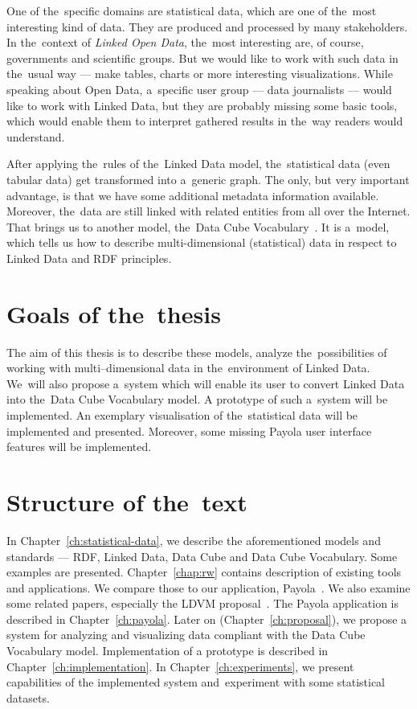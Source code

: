 One of the~specific domains are statistical data, which are one of the~most interesting kind
of data. They are produced and processed by many stakeholders. In the~context of
\emph{Linked Open Data}, the~most interesting are, of course, governments and scientific groups.
But we would like to work with such data in the~usual
way --- make tables, charts or more interesting visualizations. While speaking about Open Data, a~specific
user group --- data journalists --- would like to work with Linked Data, but they are probably
missing some basic tools, which would enable them to interpret gathered results
in the~way readers would understand.

After applying the~rules of the~Linked Data model, the~statistical data (even tabular data)
get transformed into a~generic graph. The only, but very important advantage, is that we have some additional
metadata information available. Moreover, the~data are still linked with related entities from all over the Internet.
That brings
us to another model, the~Data Cube Vocabulary~\cite{dcv}. It is a~model, which tells us how to describe
multi-dimensional (statistical) data in respect to Linked Data and RDF 
principles.

\section{Goals of the~thesis}

The aim of this thesis is to describe these models, analyze the~possibilities of 
working
with multi--dimensional data in the~environment of Linked Data. We~will also propose a~system
which will enable its user to convert Linked Data into the~Data Cube Vocabulary model.
A prototype of such a~system will be implemented. An exemplary visualisation of the~statistical
data will be implemented and presented. Moreover, some missing Payola user interface features 
will be implemented.

\section{Structure of the~text}
In Chapter~\ref{ch:statistical-data}, we describe the aforementioned 
models and standards --- RDF, Linked Data, Data Cube and Data Cube Vocabulary. 
Some examples are presented. Chapter~\ref{chap:rw} contains description of 
existing tools and applications. We compare those to our application, Payola~\cite{payola}.
We also examine some related papers, especially the LDVM proposal~\cite{ldvm}. 
The Payola application is described in Chapter~\ref{ch:payola}. Later on (Chapter~\ref{ch:proposal}),
we propose a system
for analyzing and visualizing data compliant with the Data Cube Vocabulary model.
Implementation of a prototype is described in Chapter~\ref{ch:implementation}.
In Chapter~\ref{ch:experiments}, we present capabilities of the implemented system
and~experiment with some statistical datasets.